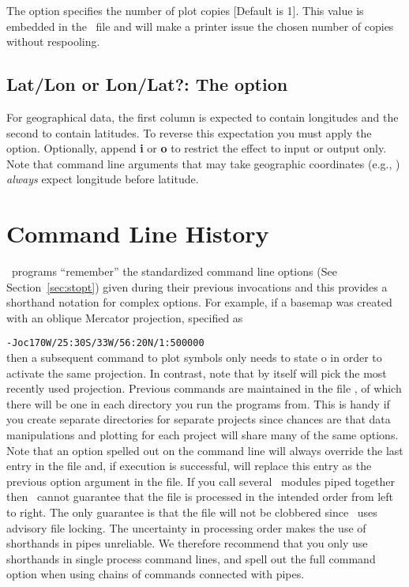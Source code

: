 The  option specifies the number of plot copies [Default is 1].  This
value is embedded in the \PS\ file and will make a printer issue the chosen
number of copies without respooling.

\subsection{Lat/Lon or Lon/Lat?: The \Opt{:} option}

For geographical data, the first column is expected to contain longitudes
and the second to contain latitudes.  To reverse this expectation you must
apply the \Opt{:} option.  Optionally, append {\bf i} or {\bf o} to restrict
the effect to input or output only.  Note that command line arguments that may take
geographic coordinates (e.g., ) \emph{always} expect longitude before
latitude.

%

\section{Command Line History}

\GMT\ programs ``remember'' the standardized command line options
(See Section~\ref{sec:stopt}) given during their previous invocations
and this provides a shorthand notation for complex options.
For example, if a basemap was created with an oblique Mercator
projection, specified as

\vspace{\baselineskip} 

\texttt{-Joc170W/25:30S/33W/56:20N/1:500000} \\ 

\vspace{\baselineskip} 
\noindent
then a subsequent  command to plot symbols only needs
to state o in order to activate the same projection.  In
contrast, note that  by itself will pick the most recently used projection.
Previous commands are maintained in the file ,
of which there will be one in each directory you run the programs
from.  This is handy if you create separate directories for
separate projects since chances are that data manipulations
and plotting for each project will share many of the same options.
Note that an option spelled out on the command line will always
override the last entry in the  file and,
if execution is successful, will replace this entry as the
previous option argument in the  file.
If you call several \GMT\ modules piped together then \GMT\ cannot
guarantee that the  file is processed
in the intended order from left to right.  The only guarantee
is that the file will not be clobbered since \GMT\ uses advisory
file locking.  The uncertainty in processing order makes the use
of shorthands in pipes unreliable.  We therefore recommend that you
only use shorthands in single process command lines, and spell out
the full command option when using chains of commands connected with
pipes.

